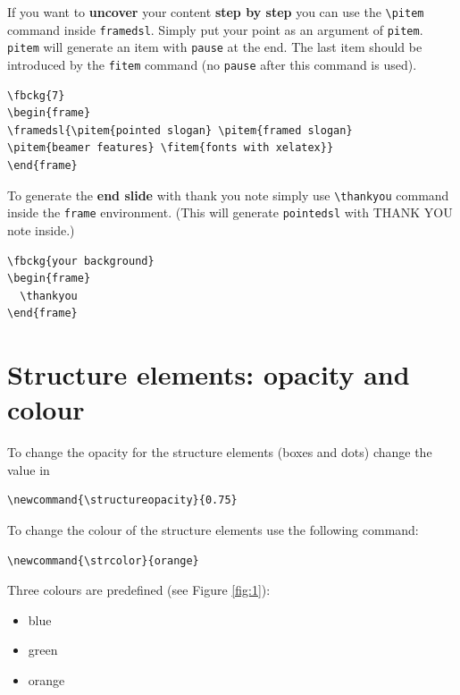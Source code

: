 \documentclass[11pt]{article}
\begin{document}
\noindent
If you want to \textbf{uncover} your content \textbf{step by step} you can use the {\tt \textbackslash pitem} command inside {\tt framedsl}. Simply put your point as an argument of {\tt pitem}. {\tt pitem} will generate an item with {\tt pause} at the end. The last item should be introduced by the {\tt fitem} command (no {\tt pause} after this command is used).

\begin{verbatim}
\fbckg{7}
\begin{frame}
\framedsl{\pitem{pointed slogan} \pitem{framed slogan} 
\pitem{beamer features} \fitem{fonts with xelatex}}
\end{frame}
\end{verbatim}


To generate the {\bf end slide} with thank you note simply use {\tt \textbackslash thankyou} command inside the \texttt{frame} environment. (This will generate \texttt{pointedsl} with THANK YOU note inside.)
\begin{verbatim}
\fbckg{your background}
\begin{frame}
  \thankyou   
\end{frame}
\end{verbatim}




\section*{Structure  elements: opacity and colour}

To change the opacity for the structure elements (boxes and dots) change the value in
\begin{verbatim}
\newcommand{\structureopacity}{0.75}
\end{verbatim}


To change the colour of the structure elements use the following command:
\begin{verbatim}
\newcommand{\strcolor}{orange}
\end{verbatim}
Three colours are predefined (see Figure \ref{fig:1}):
\begin{itemize}
\item blue
\item green
\item orange
\end{itemize}
\end{document}

